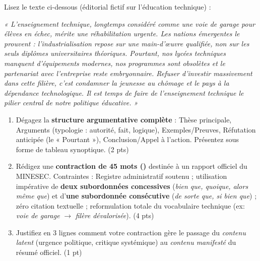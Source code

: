 \documentclass[11pt]{article}
\begin{document}
\begin{exercice}
Lisez le texte ci-dessous (éditorial fictif sur l'éducation technique) :

\textit{ « L'enseignement technique, longtemps considéré comme une voie de garage pour élèves en échec, mérite une réhabilitation urgente. Les nations émergentes le prouvent : l'industrialisation repose sur une main-d'œuvre qualifiée, non sur les seuls diplômes universitaires théoriques. Pourtant, nos lycées techniques manquent d'équipements modernes, nos programmes sont obsolètes et le partenariat avec l'entreprise reste embryonnaire. Refuser d'investir massivement dans cette filière, c'est condamner la jeunesse au chômage et le pays à la dépendance technologique. Il est temps de faire de l'enseignement technique le pilier central de notre politique éducative. » }

\begin{enumerate}
    \item Dégagez la \textbf{structure argumentative complète} : Thèse principale, Arguments (typologie : autorité, fait, logique), Exemples/Preuves, Réfutation anticipée (le « Pourtant »), Conclusion/Appel à l'action. Présentez sous forme de tableau synoptique. (2 pts)
    \item Rédigez une \textbf{contraction de 45 mots ()} destinée à un rapport officiel du MINESEC. Contraintes : Registre administratif soutenu ; utilisation impérative de \textbf{deux subordonnées concessives} (\textit{bien que, quoique, alors même que}) et d'\textbf{une subordonnée consécutive} (\textit{de sorte que, si bien que}) ; zéro citation textuelle ; reformulation totale du vocabulaire technique (ex: \textit{voie de garage} $\rightarrow$ \textit{filère dévalorisée}). (4 pts)
    \item Justifiez en 3 lignes comment votre contraction gère le passage du \textit{contenu latent} (urgence politique, critique systémique) au \textit{contenu manifesté} du résumé officiel. (1 pt)
\end{enumerate}
\end{exercice}
\end{document}
